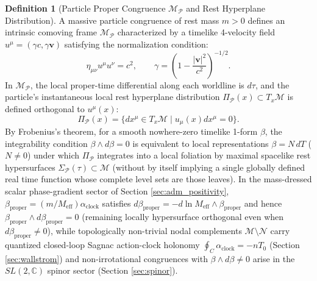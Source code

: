 \documentclass[11pt, a4paper]{article}
\theoremstyle{definition}
\newtheorem{definition}{Definition}[section]
\begin{document}
\begin{definition}[Particle Proper Congruence $\mathcal{M}_{\mathcal{P}}$ and Rest Hyperplane Distribution]
\label{def:particle_foliation}
A massive particle congruence of rest mass $m > 0$ defines an intrinsic comoving frame $\mathcal{M}_{\mathcal{P}}$ characterized by a timelike 4-velocity field $u^\mu = (\gamma c, \gamma \mathbf{v})$ satisfying the normalization condition:
\begin{equation}
\eta_{\mu\nu} u^\mu u^\nu = c^2, \qquad \gamma = \left(1 - \frac{|\mathbf{v}|^2}{c^2}\right)^{-1/2}.
\end{equation}
In $\mathcal{M}_{\mathcal{P}}$, the local proper-time differential along each worldline is $d\tau$, and the particle's instantaneous local rest hyperplane distribution $\Pi_{\mathcal{P}}(x) \subset T_x\mathcal{M}$ is defined orthogonal to $u^\mu(x)$:
\begin{equation}
\Pi_{\mathcal{P}}(x) = \{ dx^\mu \in T_x\mathcal{M} \mid u_\mu(x) dx^\mu = 0 \}.
\end{equation}
By Frobenius's theorem, for a smooth nowhere-zero timelike 1-form $\beta$, the integrability condition $\beta \wedge d\beta = 0$ is equivalent to local representations $\beta = N\,dT$ ($N \neq 0$) under which $\Pi_{\mathcal{P}}$ integrates into a local foliation by maximal spacelike rest hypersurfaces $\Sigma_{\mathcal{P}}(\tau) \subset \mathcal{M}$ (without by itself implying a single globally defined real time function whose complete level sets are those leaves). In the mass-dressed scalar phase-gradient sector of Section \ref{sec:adm_positivity}, $\beta_{\text{proper}} = (m/M_{\text{eff}})\alpha_{\text{clock}}$ satisfies $d\beta_{\text{proper}} = -d\ln M_{\text{eff}} \wedge \beta_{\text{proper}}$ and hence $\beta_{\text{proper}} \wedge d\beta_{\text{proper}} = 0$ (remaining locally hypersurface orthogonal even when $d\beta_{\text{proper}} \neq 0$), while topologically non-trivial nodal complements $\mathcal{M}\setminus\mathcal{N}$ carry quantized closed-loop Sagnac action-clock holonomy $\oint_C \alpha_{\text{clock}} = -n T_0$ (Section \ref{sec:wallstrom}) and non-irrotational congruences with $\beta \wedge d\beta \neq 0$ arise in the $SL(2,\mathbb{C})$ spinor sector (Section \ref{sec:spinor}).
\end{definition}
\end{document}
